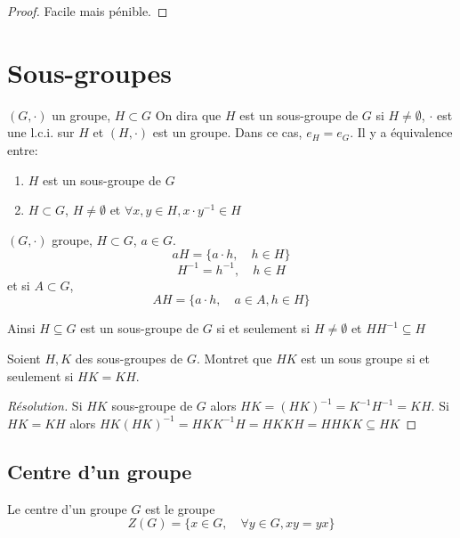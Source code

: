 \begin{proof}
    Facile mais pénible.
\end{proof}

\section{Sous-groupes}

\begin{thmdef}
    \Hyp $(G, \cdot)$ un groupe, $H\subset G$
    \Conc On dira que $H$ est un sous-groupe de $G$ si $H\neq \emptyset$, $\cdot$ est une l.c.i. sur $H$ et $(H, \cdot)$ est un groupe. Dans ce cas, $e_H=e_G$. Il y a équivalence entre: \begin{enumerate}[label=(\alph*)]
        \item $H$ est un sous-groupe de $G$
        \item $H\subset G$, $H\neq \emptyset$ et $\forall x, y\in H, x\cdot y^{-1}\in H$
    \end{enumerate}
\end{thmdef}

\begin{notation}
    $(G, \cdot)$ groupe, $H\subset G$, $a\in G$. \[
        aH=\{a\cdot h, \quad h\in H\}
    \]
    \[
        H^{-1}={h^{-1}, \quad h\in H}
    \]
    et si $A\subset G$,
    \[
        AH = \{a\cdot h, \quad a\in A, h\in H\}
    \]
\end{notation}

Ainsi $H\subseteq G$ est un sous-groupe de $G$ si et seulement si $H\neq \emptyset$ et $HH^{-1}\subseteq H$

\begin{exo}
    Soient $H, K$ des sous-groupes de $G$. Montret que $HK$ est un sous groupe si et seulement si $HK=KH$.
\end{exo}

\begin{proof}[Résolution]
    Si $HK$ sous-groupe de $G$ alors $HK=(HK)^{-1}=K^{-1}H^{-1}=KH$. Si $HK=KH$ alors $HK(HK)^{-1}=HKK^{-1}H=HKKH=HHKK\subseteq HK$
\end{proof}

\subsection{Centre d'un groupe}

\begin{dfn}
    Le centre d'un groupe $G$ est le groupe \[
        Z(G)=\{x\in G, \quad \forall y\in G, xy=yx\}
    \]
\end{dfn}

